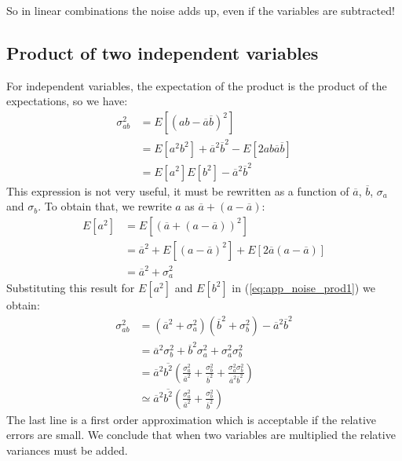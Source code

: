 \documentclass[11pt,oneside]{book}
\begin{document}
So in linear combinations the noise adds up, even
if the variables are subtracted!

\subsection{Product of two independent variables}
For independent variables, the expectation of the product is the
product of the expectations, so we have:
\begin{align}
 \sigma_{ab}^2 &= E\left[\left( ab - \overline{a} \overline{b}\right)^2\right] \nonumber\\
  &= E\left[a^2b^2\right] + \overline{a}^2\overline{b}^2 - E\left[2 a b \overline{a} \overline{b}\right] \nonumber\\
  &= E\left[a^2\right] E\left[b^2\right] - \overline{a}^2 \overline{b}^2 \label{eq:app_noise_prod1}
\end{align}
This expression is not very useful, it must be rewritten as a function of
$\overline{a}$, $\overline{b}$, $\sigma_a$ and $\sigma_b$. To obtain that, we rewrite $a$
as $\overline{a} + (a - \overline{a})$:
\begin{align}
  E\left[a^2\right] &= E\left[(\overline{a} + (a - \overline{a}))^2\right] \nonumber\\
 &= \overline{a}^2 + E\left[\left( a - \overline{a} \right)^2\right] + E\left[2 \overline{a}(a - \overline{a})\right]
       \nonumber\\
 &= \overline{a}^2 + \sigma_a^2
\end{align}
Substituting this result for $E[a^2]$ and $E[b^2]$ in
(\ref{eq:app_noise_prod1}) we obtain:
\begin{align}
\sigma_{ab}^2 &= (\overline{a}^2 + \sigma_a^2)(\overline{b}^2 + \sigma_b^2) 
                     - \overline{a}^2 \overline{b}^2 \nonumber\\
 &= \overline{a}^2\sigma_b^2 + \overline{b}^2\sigma_a^2 + \sigma_a^2 \sigma_b^2
        \nonumber\\
 &= \overline{a}^2\overline{b^2}\left( \frac{\sigma_a^2}{\overline{a}^2} + 
       \frac{\sigma_b^2}{\overline{b}^2} 
     + \frac{\sigma_a^2\sigma_b^2}{\overline{a}^2\overline{b}^2}\right)\\
 &\simeq \overline{a}^2\overline{b^2}\left( \frac{\sigma_a^2}{\overline{a}^2} + 
       \frac{\sigma_b^2}{\overline{b}^2}\right)
\end{align}
The last line is a first order approximation which is acceptable if the
relative errors are small. We conclude that when two variables are multiplied
the relative variances must be added. 
\end{document}
